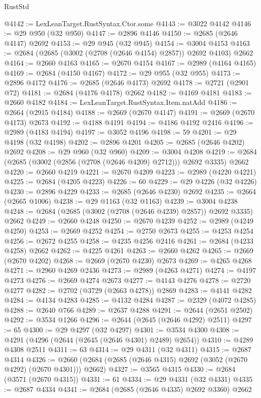 \begin{lexlean}{RustStd}
\begin{coremodule}
@4142 := LexLeanTarget.RustSyntax.Ctor.some
@4143 := @3022 @4142
@4146 := @29 @950 (@32 @950)
@4147 := @2896 @4146
@4150 := @2685 (@2646 @4147) @2692
@4153 := @29 @945 (@32 @945)
@4154 := @3004 @4153
@4163 := @2684 (@2685 (@3002 (@2708 (@2646 @4154) @2857)) @2692 @4103) @2662
@4164 := @2660 @4163
@4165 := @2670 @4154
@4167 := @2989 (@4164 @4165)
@4169 := @2684 (@4150 @4167)
@4172 := @29 @955 (@32 @955)
@4173 := @2896 @4172
@4176 := @2685 (@2646 @4173) @2692
@4178 := @2721 (@2901 @72)
@4181 := @2684 (@4176 @4178) @2662
@4182 := @4169 @4181
@4183 := @2660 @4182
@4184 := LexLeanTarget.RustSyntax.Item.natAdd
@4186 := @2664 (@2915 @4184)
@4188 := @2669 (@2670 @4147)
@4191 := @2669 (@2670 @4173) @2673
@4192 := @4188 @4191
@4194 := @4186 @4192 @2416
@4196 := @2989 (@4183 @4194)
@4197 := @3052 @4196
@4198 := 59
@4201 := @29 @4198 (@32 @4198)
@4202 := @2896 @4201
@4205 := @2685 (@2646 @4202) @2692
@4208 := @29 @960 (@32 @960)
@4209 := @3004 @4208
@4219 := @2684 (@2685 (@3002 (@2856 (@2708 (@2646 @4209) @2712))) @2692 @3335) @2662
@4220 := @2660 @4219
@4221 := @2670 @4209
@4223 := @2989 (@4220 @4221)
@4225 := @2684 (@4205 @4223)
@4226 := 60
@4229 := @29 @4226 (@32 @4226)
@4230 := @2896 @4229
@4233 := @2685 (@2646 @4230) @2692
@4235 := @2664 (@2665 @1006)
@4238 := @29 @1163 (@32 @1163)
@4239 := @3004 @4238
@4248 := @2684 (@2685 (@3002 (@2708 (@2646 @4239) @2857)) @2692 @3335) @2662
@4249 := @2660 @4248
@4250 := @2670 @4239
@4252 := @2989 (@4249 @4250)
@4253 := @2669 @4252
@4254 := @2750 @2673
@4255 := @4253 @4254
@4256 := @2672 @4255
@4258 := @4235 @4256 @2416
@4261 := @2684 (@4233 @4258) @2662
@4262 := @4225 @4261
@4263 := @2660 @4262
@4265 := @2669 (@2670 @4202)
@4268 := @2669 (@2670 @4230) @2673
@4269 := @4265 @4268
@4271 := @2960 @4269 @2436
@4273 := @2989 (@4263 @4271)
@4274 := @4197 @4273
@4276 := @2669 @4274 @2673
@4277 := @4143 @4276
@4278 := @2720 @4277
@4282 := @2702 (@3729 (@2663 @4278)) @2869
@4283 := @4141 @4282
@4284 := @4134 @4283
@4285 := @4132 @4284
@4287 := @2329 (@4072 @4285)
@4288 := @2640 @766
@4289 := @2637 @4288
@4291 := @2644 (@2651 @2502)
@4292 := @3534 @1266
@4296 := @2644 (@2645 (@2646 @4292) @2511)
@4297 := 65
@4300 := @29 @4297 (@32 @4297)
@4301 := @3534 @4300
@4308 := @4291 (@4296 (@2644 (@2645 (@2646 @4301) @2489) @2654))
@4310 := @4289 @4308 @2511
@4311 := 63
@4314 := @29 @4311 (@32 @4311)
@4315 := @2687 @4314
@4326 := @2660 (@2684 (@2685 (@2646 @4315) @2692 (@3052 (@2670 @4292) (@2670 @4301))) @2662)
@4327 := @3565 @4315
@4330 := @2684 (@3571 (@2670 @4315))
@4331 := 61
@4334 := @29 @4331 (@32 @4331)
@4335 := @2687 @4334
@4341 := @2684 (@2685 (@2646 @4335) @2692 @3360) @2662

\end{coremodule}
\end{lexlean}
